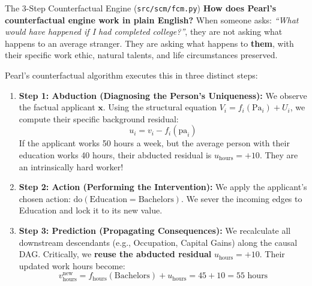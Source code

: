 \documentclass[11pt,a4paper]{article}
\begin{document}
\begin{childbranch}{The 3-Step Counterfactual Engine (\texttt{src/scm/fcm.py})}
\textbf{How does Pearl's counterfactual engine work in plain English?}
When someone asks: \emph{``What would have happened if I had completed college?''}, they are not asking what happens to an average stranger. They are asking what happens to \textbf{them}, with their specific work ethic, natural talents, and life circumstances preserved.

\medskip\noindent
Pearl's counterfactual algorithm executes this in three distinct steps:
\begin{enumerate}[leftmargin=1.5em]
    \item \textbf{Step 1: Abduction (Diagnosing the Person's Uniqueness):}
    We observe the factual applicant $\mathbf{x}$. Using the structural equation $V_i = f_i(\mathrm{Pa}_i) + U_i$, we compute their specific background residual:
    \begin{equation}
    u_i = v_i - f_i(\mathrm{pa}_i)
    \end{equation}
    If the applicant works 50 hours a week, but the average person with their education works 40 hours, their abducted residual is $u_{\text{hours}} = +10$. They are an intrinsically hard worker!
    \item \textbf{Step 2: Action (Performing the Intervention):}
    We apply the applicant's chosen action: $\mathrm{do}(\text{Education} = \text{Bachelors})$. We sever the incoming edges to Education and lock it to its new value.
    \item \textbf{Step 3: Prediction (Propagating Consequences):}
    We recalculate all downstream descendants (e.g., Occupation, Capital Gains) along the causal DAG. Critically, we \textbf{reuse the abducted residual} $u_{\text{hours}} = +10$. Their updated work hours become:
    \begin{equation}
    v_{\text{hours}}^{\text{new}} = f_{\text{hours}}(\text{Bachelors}) + u_{\text{hours}} = 45 + 10 = 55\text{ hours}
    \end{equation}
\end{enumerate}
\end{childbranch}
\end{document}
